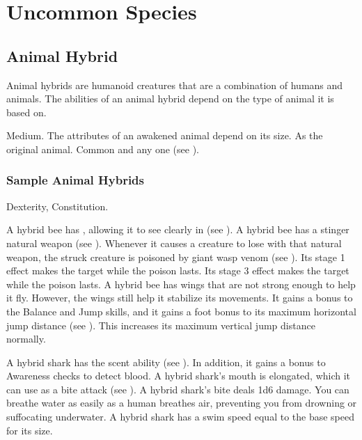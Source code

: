 \chapter{Uncommon Species}\label{Uncommon Species}

\section{Animal Hybrid}
  Animal hybrids are humanoid creatures that are a combination of humans and animals.
  The abilities of an animal hybrid depend on the type of animal it is based on.

   Medium.
   The attributes of an awakened animal depend on its size.
   As the original animal.
   Common and any one  (see ).

  \subsection{Sample Animal Hybrids}


      Dexterity,  Constitution.
    \begin{itemize}
       A hybrid bee has , allowing it to see clearly in  (see ).
       A hybrid bee has a stinger natural weapon (see ).
        Whenever it causes a creature to lose  with that natural weapon, the struck creature is poisoned by giant wasp venom (see ).
        Its stage 1 effect makes the target \slowed while the poison lasts.
        Its stage 3 effect makes the target \immobilized while the poison lasts.
       A hybrid bee has wings that are not strong enough to help it fly.
        However, the wings still help it stabilize its movements.
        It gains a  bonus to the Balance and Jump skills, and it gains a  foot bonus to its maximum horizontal jump distance (see ).
        This increases its maximum vertical jump distance normally.
    \end{itemize}


    \begin{itemize}
       A hybrid shark has the scent ability (see ).
        In addition, it gains a  bonus to Awareness checks to detect blood.
       A hybrid shark's mouth is elongated, which it can use as a bite attack (see ).
        A hybrid shark's bite deals 1d6 damage.
       You can breathe water as easily as a human breathes air, preventing you from drowning or suffocating underwater.
       A hybrid shark has a swim speed equal to the base speed for its size.
    \end{itemize}

